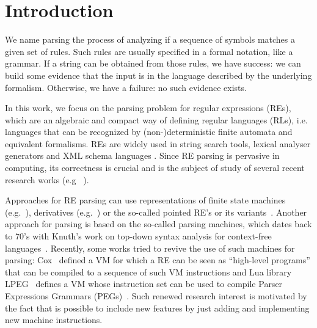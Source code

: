 \documentclass[sigplan]{acmart}
\theoremstyle{definition}
\begin{document}
\section{Introduction}

We name parsing the process of analyzing if a sequence of symbols matches a given set of rules.
Such rules are usually specified in a formal notation, like a grammar. If a string can be obtained
from those rules, we have success: we can build some evidence that the input is in the language
described by the underlying formalism. Otherwise, we have a failure: no such evidence exists.

In this work, we focus on the parsing problem for regular expressions (REs), which are an algebraic
and compact way of defining regular languages (RLs), i.e. languages that can be recognized by
(non-)deterministic finite automata and equivalent formalisms. REs are widely used in string search
tools, lexical analyser generators and XML schema languages \cite{Frisch2004}. Since RE parsing
is pervasive in computing, its correctness is crucial and is the subject of study of several
recent research works (e.g ~\cite{Firsov13,Ribeiro2017,Lopes2016,Asperti10}).

Approaches for RE parsing can use representations of finite state machines (e.g.~\cite{Firsov13}),
derivatives (e.g.~\cite{Ribeiro2017,Lopes2016}) or the so-called pointed RE's or its
variants~\cite{Asperti10,Fischer2010}. Another approach for parsing is based on the so-called
parsing machines, which dates back to 70's with Knuth's work
on top-down syntax analysis for context-free languages~\cite{Knuth71}. Recently, some works
tried to revive the use of such machines for parsing: Cox~\cite{Cox2009} defined a VM
for which a RE can be seen as ``high-level programs'' that can be compiled to a sequence of
such VM instructions and Lua library LPEG~\cite{Ierusalimschy2009} defines a VM whose instruction
set can be used to compile Parser Expressions Grammars (PEGs)~\cite{Ford04}. Such renewed research
interest is motivated by the fact that is possible to include new features by just adding and
implementing new machine instructions.
\end{document}
